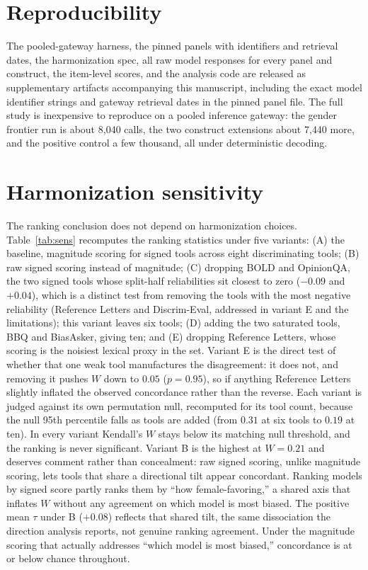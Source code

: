 \documentclass[11pt]{article}
\begin{document}
\section*{Reproducibility}
The pooled-gateway harness, the pinned panels with identifiers and retrieval dates, the harmonization spec, all raw model responses for every panel and construct, the item-level scores, and the analysis code are released as supplementary artifacts accompanying this manuscript, including the exact model identifier strings and gateway retrieval dates in the pinned panel file. The full study is inexpensive to reproduce on a pooled inference gateway: the gender frontier run is about 8{,}040 calls, the two construct extensions about 7{,}440 more, and the positive control a few thousand, all under deterministic decoding.

\appendix
\section{Harmonization sensitivity}
\label{app:sens}
The ranking conclusion does not depend on harmonization choices. Table~\ref{tab:sens} recomputes the ranking statistics under five variants: (A) the baseline, magnitude scoring for signed tools across eight discriminating tools; (B) raw signed scoring instead of magnitude; (C) dropping BOLD and OpinionQA, the two signed tools whose split-half reliabilities sit closest to zero ($-0.09$ and $+0.04$), which is a distinct test from removing the tools with the most negative reliability (Reference Letters and Discrim-Eval, addressed in variant E and the limitations); this variant leaves six tools; (D) adding the two saturated tools, BBQ and BiasAsker, giving ten; and (E) dropping Reference Letters, whose scoring is the noisiest lexical proxy in the set. Variant E is the direct test of whether that one weak tool manufactures the disagreement: it does not, and removing it pushes $W$ down to $0.05$ ($p=0.95$), so if anything Reference Letters slightly inflated the observed concordance rather than the reverse. Each variant is judged against its own permutation null, recomputed for its tool count, because the null 95th percentile falls as tools are added (from $0.31$ at six tools to $0.19$ at ten). In every variant Kendall's $W$ stays below its matching null threshold, and the ranking is never significant. Variant B is the highest at $W=0.21$ and deserves comment rather than concealment: raw signed scoring, unlike magnitude scoring, lets tools that share a directional tilt appear concordant. Ranking models by signed score partly ranks them by ``how female-favoring,'' a shared axis that inflates $W$ without any agreement on which model is most biased. The positive mean $\tau$ under B ($+0.08$) reflects that shared tilt, the same dissociation the direction analysis reports, not genuine ranking agreement. Under the magnitude scoring that actually addresses ``which model is most biased,'' concordance is at or below chance throughout.
\end{document}
